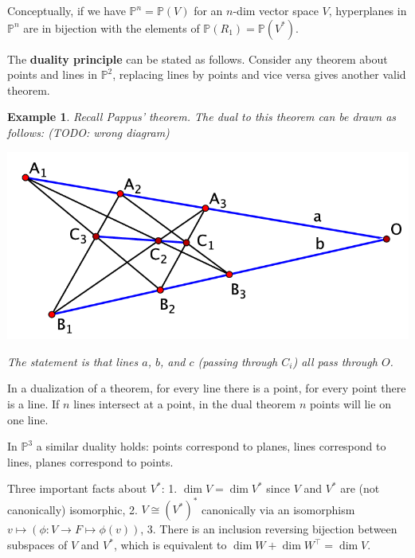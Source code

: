 \documentclass[12pt]{article}
\renewcommand{\P}{\mathbb{P}}
\newtheorem{example}[]{Example}
\begin{document}
    Conceptually, if we have $\P^n = \P(V)$ for an $n$-dim vector space $V$, hyperplanes in $\P^n$ are in bijection with the elements of $\P(R_1) = \P(V^*)$. \par 
    The \textbf{duality principle} can be stated as follows. Consider any theorem about points and lines in $\P^2$, replacing lines by points and vice versa gives another valid theorem. 
    \begin{example}
        Recall Pappus' theorem. The dual to this theorem can be drawn as follows: (TODO: wrong diagram)
        \begin{center}
            \includegraphics[width = 0.7\linewidth]{pappus dual.png}
        \end{center}
        The statement is that lines $a$, $b$, and $c$ (passing through $C_i$) all pass through $O$. 
    \end{example} 
    In a dualization of a theorem, for every line there is a point, for every point there is a line. If $n$ lines intersect at a point, in the dual theorem $n$ points will lie on one line. \par 
    In $\P^3$ a similar duality holds: points correspond to planes, lines correspond to lines, planes correspond to points. \par 
    Three important facts about $V^*$: 1. $\dim V = \dim V^*$ since $V$ and $V^*$ are (not canonically) isomorphic, 2. $V \cong (V^*)^*$ canonically via an isomorphism $v \mapsto (\phi: V \to F \mapsto \phi(v))$, 3. There is an inclusion reversing bijection between subspaces of $V$ and $V^*$, which is equivalent to $\dim W + \dim W^\top = \dim V$. 
\end{document}
